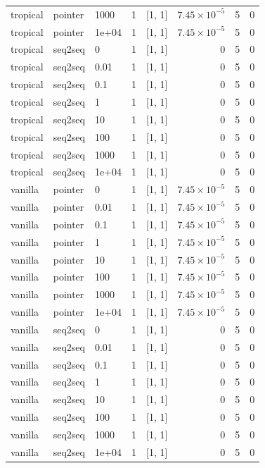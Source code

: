 \documentclass[10pt]{article}
\begin{document}
{\begin{longtable}{lllrlrrr}
tropical & pointer & 1000 & 1 & [1, 1] & $7.45\times10^{-5}$ & 5 & 0\\
tropical & pointer & 1e+04 & 1 & [1, 1] & $7.45\times10^{-5}$ & 5 & 0\\
tropical & seq2seq & 0 & 1 & [1, 1] & 0 & 5 & 0\\
tropical & seq2seq & 0.01 & 1 & [1, 1] & 0 & 5 & 0\\
tropical & seq2seq & 0.1 & 1 & [1, 1] & 0 & 5 & 0\\
tropical & seq2seq & 1 & 1 & [1, 1] & 0 & 5 & 0\\
tropical & seq2seq & 10 & 1 & [1, 1] & 0 & 5 & 0\\
tropical & seq2seq & 100 & 1 & [1, 1] & 0 & 5 & 0\\
tropical & seq2seq & 1000 & 1 & [1, 1] & 0 & 5 & 0\\
tropical & seq2seq & 1e+04 & 1 & [1, 1] & 0 & 5 & 0\\
vanilla & pointer & 0 & 1 & [1, 1] & $7.45\times10^{-5}$ & 5 & 0\\
vanilla & pointer & 0.01 & 1 & [1, 1] & $7.45\times10^{-5}$ & 5 & 0\\
vanilla & pointer & 0.1 & 1 & [1, 1] & $7.45\times10^{-5}$ & 5 & 0\\
vanilla & pointer & 1 & 1 & [1, 1] & $7.45\times10^{-5}$ & 5 & 0\\
vanilla & pointer & 10 & 1 & [1, 1] & $7.45\times10^{-5}$ & 5 & 0\\
vanilla & pointer & 100 & 1 & [1, 1] & $7.45\times10^{-5}$ & 5 & 0\\
vanilla & pointer & 1000 & 1 & [1, 1] & $7.45\times10^{-5}$ & 5 & 0\\
vanilla & pointer & 1e+04 & 1 & [1, 1] & $7.45\times10^{-5}$ & 5 & 0\\
vanilla & seq2seq & 0 & 1 & [1, 1] & 0 & 5 & 0\\
vanilla & seq2seq & 0.01 & 1 & [1, 1] & 0 & 5 & 0\\
vanilla & seq2seq & 0.1 & 1 & [1, 1] & 0 & 5 & 0\\
vanilla & seq2seq & 1 & 1 & [1, 1] & 0 & 5 & 0\\
vanilla & seq2seq & 10 & 1 & [1, 1] & 0 & 5 & 0\\
vanilla & seq2seq & 100 & 1 & [1, 1] & 0 & 5 & 0\\
vanilla & seq2seq & 1000 & 1 & [1, 1] & 0 & 5 & 0\\
vanilla & seq2seq & 1e+04 & 1 & [1, 1] & 0 & 5 & 0\\
\bottomrule
\end{longtable}
}
\end{document}
